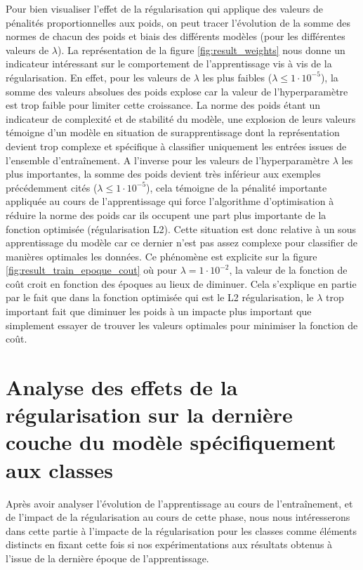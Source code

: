 \documentclass[12pt,english, openany]{book}
\begin{document}
Pour bien visualiser l'effet de la régularisation qui applique des valeurs de pénalités proportionnelles aux poids, on peut tracer l'évolution de la somme des normes de chacun des poids et biais des différents modèles (pour les différentes valeurs de $\lambda$). La représentation de la figure \ref{fig:result_weights} nous donne un indicateur intéressant sur le comportement de l'apprentissage vis à vis de la régularisation. En effet, pour les valeurs de $\lambda$ les plus faibles ($\lambda \leq 1\cdot 10^{-5}$), la somme des valeurs absolues des poids explose car la valeur de l'hyperparamètre est trop faible pour limiter cette croissance. La norme des poids étant un indicateur de complexité et de stabilité du modèle, une explosion de leurs valeurs témoigne d'un modèle en situation de surapprentissage dont la représentation devient trop complexe et spécifique à classifier uniquement les entrées issues de l'ensemble d'entraînement. A l'inverse pour les valeurs de l'hyperparamètre $\lambda$ les plus importantes, la somme des poids devient très inférieur aux exemples précédemment cités ($\lambda \leq 1\cdot 10^{-5}$), cela témoigne de la pénalité importante appliquée au cours de l'apprentissage qui force l'algorithme d'optimisation à réduire la norme des poids car ils occupent une part plus importante de la fonction optimisée (régularisation L2). Cette situation est donc relative à un sous apprentissage du modèle car ce dernier n'est pas assez complexe pour classifier de manières optimales les données. Ce phénomène est explicite sur la figure \ref{fig:result_train_epoque_cout} où pour $\lambda = 1\cdot 10^{-2}$, la valeur de la fonction de coût croit en fonction des époques au lieux de diminuer. Cela s'explique en partie par le fait que dans la fonction optimisée qui est le L2 régularisation, le $\lambda$ trop important fait que diminuer les poids à un impacte plus important que simplement essayer de trouver les valeurs optimales pour minimiser la fonction de coût. 


\chapter{Analyse des effets de la régularisation sur la dernière couche du modèle spécifiquement aux classes}
\label{chap:5}

Après avoir analyser l'évolution de l'apprentissage au cours de l'entraînement, et de l'impact de la régularisation au cours de cette phase, nous nous intéresserons dans cette partie à l'impacte de la régularisation pour les classes comme éléments distincts en fixant cette fois si nos expérimentations aux résultats obtenus à l'issue de la dernière époque de l'apprentissage.\\
\end{document}
